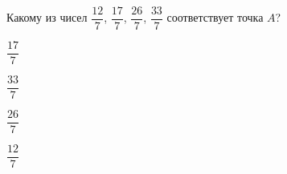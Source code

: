 \begin{ex}
	Какому из чисел $\dfrac{12}{7}$, $\dfrac{17}{7}$, $\dfrac{26}{7}$, $\dfrac{33}{7}$ соответствует точка $A$?
	
	\selectanswer
	\begin{enumcols}[columns=4]
		\item $\dfrac{17}{7}$
		\item $\dfrac{33}{7}$
		\item $\dfrac{26}{7}$
		\item $\dfrac{12}{7}$
	\end{enumcols}
\end{ex}